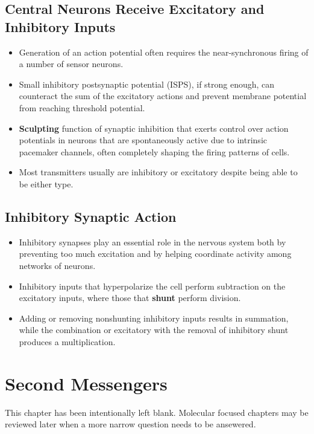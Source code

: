 \documentclass[12pt,a4paper]{article}
\begin{document}
\subsection{Central Neurons Receive Excitatory and Inhibitory Inputs}
\begin{itemize}
    \item Generation of an action potential often requires the near-synchronous firing of a number of sensor neurons.
    \item Small inhibitory postsynaptic potential (ISPS), if strong enough, can counteract the sum of the excitatory actions and prevent membrane potential from reaching threshold potential.
    \item \textbf{Sculpting} function of synaptic inhibition that exerts control over action potentials in neurons that are spontaneously active due to intrinsic pacemaker channels, often completely shaping the firing patterns of cells.
    \item Most transmitters usually are inhibitory or excitatory despite being able to be either type. 
\end{itemize}

\subsection{Inhibitory Synaptic Action}
\begin{itemize}
    \item Inhibitory synapses play an essential role in the nervous system both by preventing too much excitation and by helping coordinate activity among networks of neurons. 
    \item Inhibitory inputs that hyperpolarize the cell perform subtraction on the excitatory inputs, where those that \textbf{shunt} perform division. 
    \item Adding or removing nonshunting inhibitory inputs results in summation, while the combination or excitatory with the removal of inhibitory shunt produces a multiplication.
\end{itemize}




\clearpage
\section{Second Messengers}
    This chapter has been intentionally left blank. Molecular focused chapters may be reviewed later when a more narrow question needs to be ansewered. 
\end{document}
